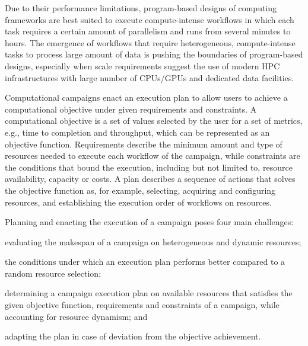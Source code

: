 Due to their performance limitations, program-based designs of computing frameworks are best suited to execute compute-intense workflows in which each task requires a certain amount of parallelism and runs from several minutes to hours.
The emergence of workflows that require heterogeneous, compute-intense tasks to process large amount of data is pushing the boundaries of program-based designs, especially when scale requirements suggest the use of modern HPC infrastructures with large number of CPUs/GPUs and dedicated data facilities.

Computational campaigns enact an execution plan to allow users to achieve a computational objective under given requirements and constraints.
A computational objective is a set of values selected by the user for a set of metrics, e.g., time to completion and throughput, which can be represented as an objective function.
Requirements describe the minimum amount and type of resources needed to execute each workflow of the campaign, while constraints are the conditions that bound the execution, including but not limited to, resource availability, capacity or costs.
A plan describes a sequence of actions that solves the objective function as, for example, selecting, acquiring and configuring resources, and establishing the execution order of workflows on resources.


Planning and enacting the execution of a campaign poses four main challenges: 
\begin{inparaenum}[(i)]
    \item evaluating the makespan of a campaign on heterogeneous and dynamic resources;
    \item the conditions under which an execution plan performs better compared to a random resource selection;
    \item determining a campaign execution plan on available resources that satisfies the given objective function, requirements and constraints of a campaign, while accounting for resource dynamism; and
    \item adapting the plan in case of deviation from the objective achievement.
\end{inparaenum}

